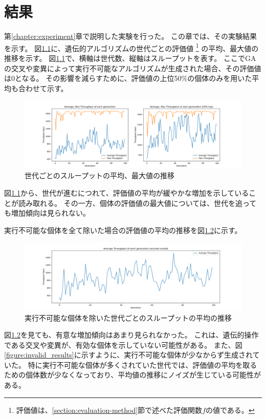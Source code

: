 \documentclass[a4paper,11pt]{jreport}
\newcommand{\figref}[1]{図\ref{#1}}
\newcommand{\chapref}[1]{第\ref{#1}章}
\newcommand{\secref}[1]{\ref{#1}節}
\begin{document}
\newpage

\chapter{結果}

\label{chapter:result}
\chapref{chapter:experiment}で説明した実験を行った。
この章では、その実験結果を示す。
\figref{figure:generation_throughput}に、遺伝的アルゴリズムの世代ごとの評価値
\footnote{評価値は、\secref{section:evaluation-method}で述べた評価関数$f$の値である。}
の平均、最大値の推移を示す。
\figref{figure:generation_throughput}で、横軸は世代数、縦軸はスループットを表す。
ここでGAの交叉や変異によって実行不可能なアルゴリズムが生成された場合、その評価値は0となる。
その影響を減らすために、評価値の上位50\%の個体のみを用いた平均も合わせて示す。
\begin{figure}[thbp]
  \setlength\fboxsep{0pt}
  \centering
  \includegraphics[width=0.9\linewidth]{fig/chap05/generation_throughput.png}
  \caption{世代ごとのスループットの平均、最大値の推移}
  \label{figure:generation_throughput}
\end{figure}
\figref{figure:generation_throughput}から、世代が進むにつれて、評価値の平均が緩やかな増加を示していることが読み取れる。
その一方、個体の評価値の最大値については、世代を追っても増加傾向は見られない。

実行不可能な個体を全て除いた場合の評価値の平均の推移を\figref{figure:generation_result_exclude_zero}に示す。
\begin{figure}[thbp]
  \setlength\fboxsep{0pt}
  \centering
  \includegraphics[width=0.9\linewidth]{fig/chap05/generation_throughput_exclude_zero.png}
  \caption{実行不可能な個体を除いた世代ごとのスループットの平均の推移}
  \label{figure:generation_result_exclude_zero}
\end{figure}
\figref{figure:generation_result_exclude_zero}を見ても、有意な増加傾向はあまり見られなかった。
これは、遺伝的操作である交叉や変異が、有効な個体を示していない可能性がある。
また、\figref{figure:invalid_results}に示すように、実行不可能な個体が少なからず生成されていた。
特に実行不可能な個体が多くされていた世代では、評価値の平均を取るための個体数が少なくなっており、平均値の推移にノイズが生じている可能性がある。
\end{document}
